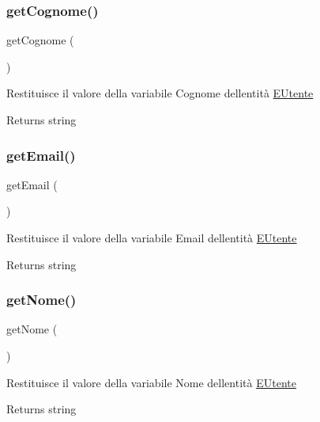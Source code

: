 \subsubsection{\texorpdfstring{get\+Cognome()}{getCognome()}}
{\footnotesize\ttfamily get\+Cognome (\begin{DoxyParamCaption}{ }\end{DoxyParamCaption})}

Restituisce il valore della variabile Cognome dell\textquotesingle{}entità \mbox{\hyperlink{class_e_utente}{E\+Utente}}

\begin{DoxyReturn}{Returns}
string 
\end{DoxyReturn}
\mbox{\label{class_e_utente_a02a01849f28e2535e888ae4ec87b20f2}} 
\subsubsection{\texorpdfstring{get\+Email()}{getEmail()}}
{\footnotesize\ttfamily get\+Email (\begin{DoxyParamCaption}{ }\end{DoxyParamCaption})}

Restituisce il valore della variabile Email dell\textquotesingle{}entità \mbox{\hyperlink{class_e_utente}{E\+Utente}}

\begin{DoxyReturn}{Returns}
string 
\end{DoxyReturn}
\mbox{\label{class_e_utente_a67fa74a47af3f2f9eeced7c37c2ef0d3}} 
\subsubsection{\texorpdfstring{get\+Nome()}{getNome()}}
{\footnotesize\ttfamily get\+Nome (\begin{DoxyParamCaption}{ }\end{DoxyParamCaption})}

Restituisce il valore della variabile Nome dell\textquotesingle{}entità \mbox{\hyperlink{class_e_utente}{E\+Utente}}

\begin{DoxyReturn}{Returns}
string 
\end{DoxyReturn}
\mbox{\label{class_e_utente_a04e0957baeb7acde9c0c86556da2d43f}} 
